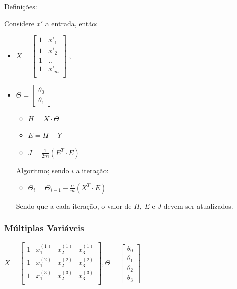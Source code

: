 \documentclass[11pt]{article}
\providecommand{\tightlist}{%
      \setlength{\itemsep}{0pt}\setlength{\parskip}{0pt}}
\begin{document}
Definições:

Considere \(x'\) a entrada, então:

\begin{itemize}
\tightlist
\item
  \(X=\begin{bmatrix}  1 & x'_1 \\  1 & x'_2 \\  1 & .. \\  1 & x'_m \\  \end{bmatrix}\)
  ,
\item
  \(\Theta=\begin{bmatrix}  \theta_0\\  \theta_1  \end{bmatrix}\)

  \begin{itemize}
  \tightlist
  \item
    \(H=X \cdot \Theta\)
  \item
    \(E=H - Y\)
  \item
    \(J=\frac{1}{2m}(E^T \cdot E)\)
  \end{itemize}

  Algoritmo; sendo \(i\) a iteração:

  \begin{itemize}
  \tightlist
  \item
    \(\Theta_i=\Theta_{i-1} - \frac{\alpha}{m}(X^T \cdot E)\)
  \end{itemize}

  Sendo que a cada iteração, o valor de \(H\), \(E\) e \(J\) devem ser
  atualizados.
\end{itemize}

\hypertarget{muxfaltiplas-variuxe1veis}{%
\subsubsection{Múltiplas Variáveis}\label{muxfaltiplas-variuxe1veis}}

\(X=\begin{bmatrix} 1 & x^{(1)}_1 & x^{(1)}_2 & x^{(1)}_3 \\ 1 & x^{(2)}_1 & x^{(2)}_2 & x^{(2)}_3 \\ 1 & x^{(3)}_1 & x^{(3)}_2 & x^{(3)}_3 \\ \end{bmatrix}, \Theta=\begin{bmatrix} \theta_0 \\ \theta_1 \\ \theta_2 \\ \theta_3 \end{bmatrix}\)
\end{document}

